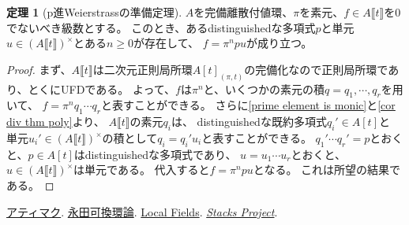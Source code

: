 \documentclass[uplatex]{jsarticle}
\theoremstyle{definition}
\newtheorem{thm}{定理}[section]
\newcommand{\lb}[1]{\llbracket #1\rrbracket}
\begin{document}
\begin{thm}[p進Weierstrassの準備定理]
  \(A\)を完備離散付値環、\(\pi\)を素元、\(f\in A\lb{t}\)を\(0\)でないべき級数とする。
  このとき、あるdistinguishedな多項式\(p\)と単元\(u\in (A\lb{t})^{\times}\)とある\(n\geq 0\)が存在して、
  \(f = \pi^npu\)が成り立つ。
\end{thm}

\begin{proof}
  まず、\(A\lb{t}\)は二次元正則局所環\(A[t]_{(\pi,t)}\)の完備化なので正則局所環であり、とくにUFDである。
  よって、\(f\)は\(\pi^n\)と、いくつかの素元の積\(q = q_1,\cdots,q_r\)を用いて、
  \(f=\pi^nq_1\cdots q_r\)と表すことができる。
  さらに\autoref{prime element is monic}と\autoref{cor div thm poly}より、
  \(A\lb{t}\)の素元\(q_i\)は、
  distinguishedな既約多項式\(q_i'\in A[t]\)と
  単元\(u_i'\in (A\lb{t})^{\times}\)の積として\(q_i = q_i'u_i\)と表すことができる。
  \(q_1'\cdots q_r' = p\)とおくと、\(p\in A[t]\)はdistinguishedな多項式であり、
  \(u = u_1\cdots u_r\)とおくと、\(u\in (A\lb{t})^{\times}\)は単元である。
  代入すると\(f=\pi^npu\)となる。
  これは所望の結果である。
\end{proof}






\begin{thebibliography}{9}
  \href{https://www.kyoritsu-pub.co.jp/bookdetail/9784320017917}{アティマク}.
  \href{https://www.kinokuniya.co.jp/f/dsg-08-EK-0257022}{永田可換環論}.
  \href{https://link.springer.com/book/10.1007/978-1-4757-5673-9}{Local Fields}.
  \href{https://stacks.math.columbia.edu/}{\textit{Stacks Project}}.
\end{thebibliography}
\end{document}
